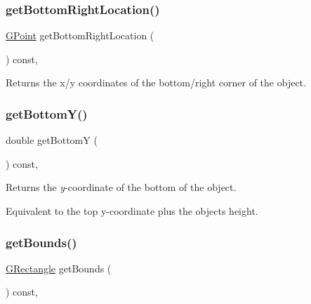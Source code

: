 \mbox{\label{classsgl_1_1GObject_a0d41183bf6b08de66fe3907551aab0d7}} 
\subsubsection{\texorpdfstring{get\+Bottom\+Right\+Location()}{getBottomRightLocation()}}
{\footnotesize\ttfamily \mbox{\hyperlink{structsgl_1_1GPoint}{G\+Point}} get\+Bottom\+Right\+Location (\begin{DoxyParamCaption}{ }\end{DoxyParamCaption}) const\hspace{0.3cm}{\ttfamily [virtual]}, {\ttfamily [inherited]}}



Returns the x/y coordinates of the bottom/right corner of the object. 

\mbox{\label{classsgl_1_1GObject_a4316a2406c18e1c6d061fe51fd355490}} 
\subsubsection{\texorpdfstring{get\+Bottom\+Y()}{getBottomY()}}
{\footnotesize\ttfamily double get\+BottomY (\begin{DoxyParamCaption}{ }\end{DoxyParamCaption}) const\hspace{0.3cm}{\ttfamily [virtual]}, {\ttfamily [inherited]}}



Returns the {\itshape y}-\/coordinate of the bottom of the object. 

Equivalent to the top y-\/coordinate plus the object\textquotesingle{}s height. \mbox{\label{classsgl_1_1GCompound_a89040ce9277825772d359fccd33bca86}} 
\subsubsection{\texorpdfstring{get\+Bounds()}{getBounds()}}
{\footnotesize\ttfamily \mbox{\hyperlink{structsgl_1_1GRectangle}{G\+Rectangle}} get\+Bounds (\begin{DoxyParamCaption}{ }\end{DoxyParamCaption}) const\hspace{0.3cm}{\ttfamily [override]}, {\ttfamily [virtual]}}



